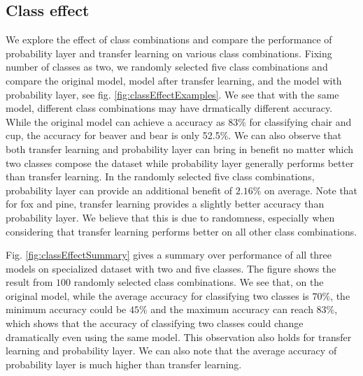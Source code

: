 \documentclass{article}
\begin{document}
\subsection{Class effect}
We explore the effect of class combinations and compare the performance of probability layer and transfer learning on various class combinations. Fixing number of classes as two, we randomly selected five class combinations and compare the original model, model after transfer learning, and the model with probability layer, see fig. \ref{fig:classEffectExamples}. We see that with the same model, different class combinations may have drmatically different accuracy. While the original model can achieve a accuracy as 83\% for classifying chair and cup, the accuracy for beaver and bear is only 52.5\%. We can also observe that both transfer learning and probability layer can bring in benefit no matter which two classes compose the dataset while probability layer generally performs better than transfer learning. In the randomly selected five class combinations, probability layer can provide an additional benefit of $2.16\%$ on average. Note that for fox and pine, transfer learning provides a slightly better accuracy than probability layer. We believe that this is due to randomness, especially when considering that transfer learning performs better on all other class combinations. 

Fig. \ref{fig:classEffectSummary} gives a summary over performance of all three models on specialized dataset with two and five classes. The figure shows the result from $100$ randomly selected class combinations. We see that, on the original model, while the average accuracy for classifying two classes is $70\%$, the minimum accuracy could be $45\%$ and the maximum accuracy can reach $83\%$, which shows that the accuracy of classifying two classes could change dramatically even using the same model. This observation also holds for transfer learning and probability layer. We can also note that the average accuracy of probability layer is much higher than transfer learning. 
\end{document}
